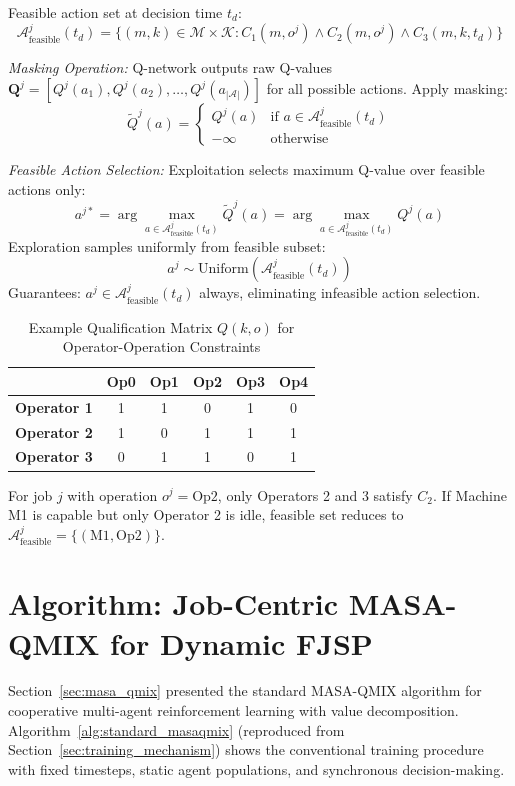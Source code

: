 Feasible action set at decision time \( t_d \):
\[
\mathcal{A}_{\text{feasible}}^j(t_d) = \{(m, k) \in \mathcal{M} \times \mathcal{K} : C_1(m, o^j) \land C_2(m, o^j) \land C_3(m, k, t_d)\}
\]

\textit{Masking Operation:} Q-network outputs raw Q-values \( \mathbf{Q}^j = [Q^j(a_1), Q^j(a_2), \ldots, Q^j(a_{|\mathcal{A}|}) ] \) for all possible actions. Apply masking:
\[
\tilde{Q}^j(a) = \begin{cases}
Q^j(a) & \text{if } a \in \mathcal{A}_{\text{feasible}}^j(t_d) \\
-\infty & \text{otherwise}
\end{cases}
\]

\textit{Feasible Action Selection:} Exploitation selects maximum Q-value over feasible actions only:
\[
a^{j*} = \arg\max_{a \in \mathcal{A}_{\text{feasible}}^j(t_d)} \tilde{Q}^j(a) = \arg\max_{a \in \mathcal{A}_{\text{feasible}}^j(t_d)} Q^j(a)
\]
Exploration samples uniformly from feasible subset:
\[
a^j \sim \text{Uniform}(\mathcal{A}_{\text{feasible}}^j(t_d))
\]
Guarantees: \( a^j \in \mathcal{A}_{\text{feasible}}^j(t_d) \) always, eliminating infeasible action selection.

\begin{table}[h]
\centering
\caption{Example Qualification Matrix \( Q(k, o) \) for Operator-Operation Constraints}
\label{tab:qualification_matrix}
\small
\begin{tabular}{lccccc}
\hline
 & \textbf{Op0} & \textbf{Op1} & \textbf{Op2} & \textbf{Op3} & \textbf{Op4} \\
\hline
\textbf{Operator 1} & 1 & 1 & 0 & 1 & 0 \\
\textbf{Operator 2} & 1 & 0 & 1 & 1 & 1 \\
\textbf{Operator 3} & 0 & 1 & 1 & 0 & 1 \\
\hline
\end{tabular}
\end{table}

For job \( j \) with operation \( o^j = \text{Op2} \), only Operators 2 and 3 satisfy \( C_2 \). If Machine M1 is capable but only Operator 2 is idle, feasible set reduces to \( \mathcal{A}_{\text{feasible}}^j = \{(\text{M1}, \text{Op2})\} \).


\section{Algorithm: Job-Centric MASA-QMIX for Dynamic FJSP}
\label{sec:algorithm}

Section~\ref{sec:masa_qmix} presented the standard MASA-QMIX algorithm for cooperative multi-agent reinforcement learning with value decomposition. Algorithm~\ref{alg:standard_masaqmix} (reproduced from Section~\ref{sec:training_mechanism}) shows the conventional training procedure with fixed timesteps, static agent populations, and synchronous decision-making.

